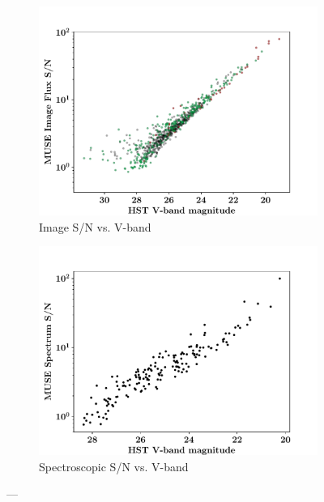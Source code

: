 \documentclass[12pt, twocolumn]{revtex4}    %
\begin{document}
\begin{figure}
  \begin{subfigure}[b]{0.495\textwidth}
    \includegraphics[width=\textwidth]{data/image_sn_vs_vband}
    \captionsetup{justification=justified}
    \caption{Image S/N vs. V-band}
    \label{fig:image_sn_vband}
  \end{subfigure}
  \begin{subfigure}[b]{0.495\textwidth}
    \includegraphics[width=\textwidth]{data/sn_vs_vband}
    \captionsetup{justification=justified}    
    \caption{Spectroscopic S/N vs. V-band}
    \label{fig:spec_sn_vband}
  \end{subfigure}
  \caption[HUDF Objects]{---}
\end{figure}
\end{document}
